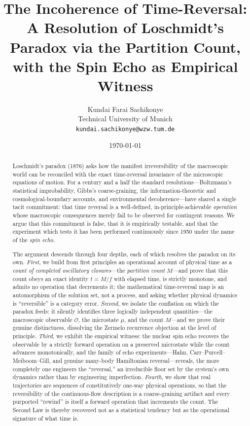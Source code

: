\documentclass[11pt,a4paper]{article}
\title{\textbf{The Incoherence of Time-Reversal:\\[2pt]
A Resolution of Loschmidt's Paradox via the Partition Count,\\
with the Spin Echo as Empirical Witness}}
\author{Kundai Farai Sachikonye\\
Technical University of Munich\\
\texttt{kundai.sachikonye@wzw.tum.de}}
\date{\today}
\theoremstyle{thmstyle}
\theoremstyle{definition}
\theoremstyle{remark}
\newcommand{\Count}{M}
\newcommand{\Obs}{\mathcal{O}}
\newcommand{\Mic}{\mu}
\begin{document}
\maketitle

\begin{abstract}
\noindent
Loschmidt's paradox (1876) asks how the manifest irreversibility of the
macroscopic world can be reconciled with the exact time-reversal
invariance of the microscopic equations of motion. For a century and a
half the standard resolutions---Boltzmann's statistical improbability,
Gibbs's coarse-graining, the information-theoretic and
cosmological-boundary accounts, and environmental decoherence---have
shared a single tacit commitment: that time reversal is a well-defined,
in-principle-achievable \emph{operation} whose macroscopic consequences
merely fail to be observed for contingent reasons. We argue that this
commitment is false, that it is empirically testable, and that the
experiment which tests it has been performed continuously since 1950
under the name of the \emph{spin echo}.

The argument descends through four depths, each of which resolves the
paradox on its own. \emph{First}, we build from first principles an
operational account of physical time as a \emph{count of completed
oscillatory closures}---the \emph{partition count} $\Count$---and prove
that this count obeys an exact identity $t=\Count/f$ with elapsed time,
is strictly monotone, and admits no operation that decrements it; the
mathematical time-reversal map is an automorphism of the solution set,
not a process, and asking whether physical dynamics is ``reversible'' is
a category error. \emph{Second}, we isolate the conflation on which the
paradox feeds: it silently identifies three logically independent
quantities---the macroscopic observable $\Obs$, the microstate $\Mic$,
and the count $\Count$---and we prove their genuine distinctness,
dissolving the Zermelo recurrence objection at the level of principle.
\emph{Third}, we exhibit the empirical witness: the nuclear spin echo
recovers the observable by a strictly forward operation on a preserved
microstate while the count advances monotonically, and the family of
echo experiments---Hahn, Carr--Purcell--Meiboom--Gill, and genuine
many-body Hamiltonian reversal---reveals, the more completely one
engineers the ``reversal,'' an irreducible floor set by the system's own
dynamics rather than by engineering imperfection. \emph{Fourth}, we show
that real trajectories are sequences of constitutively one-way physical
operations, so that the reversibility of the continuous-flow description
is a coarse-graining artifact and every purported ``rewind'' is itself a
forward operation that increments the count. The Second Law is thereby
recovered not as a statistical tendency but as the operational signature
of what time is.
\end{abstract}
\end{document}
